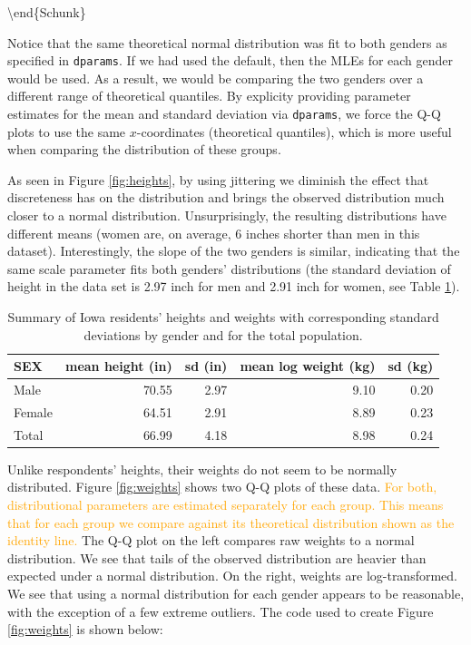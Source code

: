 \textbackslash{}end\{Schunk\}

Notice that the same theoretical normal distribution was fit to both
genders as specified in \texttt{dparams}. If we had used the default,
then the MLEs for each gender would be used. As a result, we would be
comparing the two genders over a different range of theoretical
quantiles. By explicity providing parameter estimates for the mean and
standard deviation via \texttt{dparams}, we force the Q-Q plots to use
the same \(x\)-coordinates (theoretical quantiles), which is more useful
when comparing the distribution of these groups.

As seen in Figure \ref{fig:heights}, by using jittering we diminish the
effect that discreteness has on the distribution and brings the observed
distribution much closer to a normal distribution. Unsurprisingly, the
resulting distributions have different means (women are, on average, 6
inches shorter than men in this dataset). Interestingly, the slope of
the two genders is similar, indicating that the same scale parameter
fits both genders' distributions (the standard deviation of height in
the data set is 2.97 inch for men and 2.91 inch for women, see Table
\ref{tab:heights}).

\begin{table}

\caption{\label{tab:heights-table}Summary of Iowa residents' heights and weights with corresponding standard deviations by gender and for the total population.\label{tab:heights}}
\centering
\begin{tabular}[t]{lrrrr}
\toprule
SEX & mean height (in) & sd (in) & mean log weight (kg) & sd (kg)\\
\midrule
Male & 70.55 & 2.97 & 9.10 & 0.20\\
Female & 64.51 & 2.91 & 8.89 & 0.23\\
Total & 66.99 & 4.18 & 8.98 & 0.24\\
\bottomrule
\end{tabular}
\end{table}

Unlike respondents' heights, their weights do not seem to be normally
distributed. Figure \ref{fig:weights} shows two Q-Q plots of these data.
{\textcolor{orange}{For both, distributional parameters are estimated separately for each group. This means that for each group we compare against its theoretical distribution shown as the identity line.}}
The Q-Q plot on the left compares raw weights to a normal distribution.
We see that tails of the observed distribution are heavier than expected
under a normal distribution. On the right, weights are log-transformed.
We see that using a normal distribution for each gender appears to be
reasonable, with the exception of a few extreme outliers. The code used
to create Figure \ref{fig:weights} is shown below:

